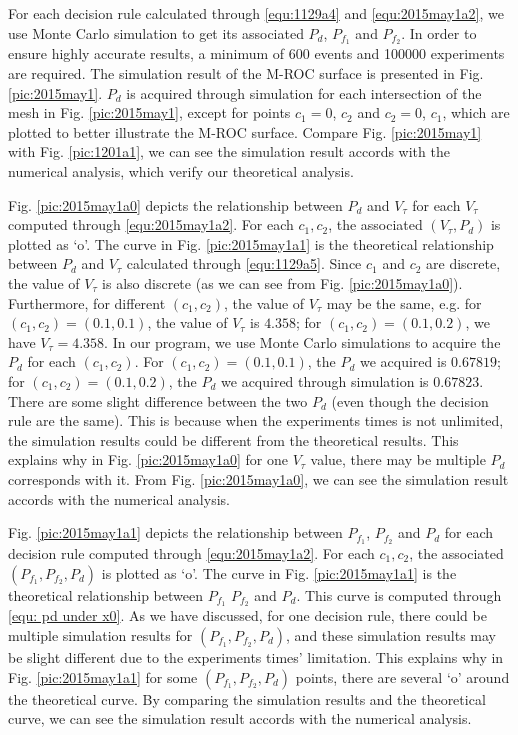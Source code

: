 For each decision rule calculated through \eqref{equ:1129a4} and \eqref{equ:2015may1a2}, we use Monte Carlo simulation to get its associated $P_d$, $P_{f_1}$ and $P_{f_2}$.   
In order to ensure highly accurate results, a minimum of 600 events and 100000 experiments are required. The simulation result of the M-ROC surface is presented in Fig. \ref{pic:2015may1}. $P_d$ is acquired through simulation for each intersection of the mesh in Fig. \ref{pic:2015may1}, except for points $c_1 = 0$, $c_2$ and $c_2 = 0$, $c_1$, which are plotted to better illustrate the M-ROC surface. 
Compare Fig. \ref{pic:2015may1} with Fig. \ref{pic:1201a1}, we can see the simulation result accords with the numerical analysis, which verify our theoretical analysis.

Fig. \ref{pic:2015may1a0} depicts the relationship between  $P_d$ and $V_\tau$ for each $V_\tau$  computed through \eqref{equ:2015may1a2}.  For each $c_1, c_2$, the associated $(V_\tau, P_d)$ is plotted as `o'. The curve in Fig. \ref{pic:2015may1a1} is the theoretical relationship between $P_d$ and $V_\tau$ calculated through \eqref{equ:1129a5}. 
Since $c_1$ and $c_2$ are discrete, the value of $V_\tau$ is also discrete (as we can see from Fig. \ref{pic:2015may1a0}). Furthermore, for different $(c_1, c_2)$, the value of $V_\tau$ may be the same, 
e.g. for $(c_1, c_2) = (0.1, 0.1)$, the value of $V_\tau$ is $4.358$; for $(c_1, c_2) = (0.1, 0.2)$, we have $V_\tau = 4.358$.  
In our program, we use Monte Carlo simulations to acquire the $P_d$ for each $(c_1, c_2)$.  For  $(c_1, c_2) = (0.1, 0.1)$, the $P_d$ we acquired is $0.67819$; for $(c_1, c_2) = (0.1, 0.2)$, the $P_d$ we acquired through simulation is $0.67823$. There are some slight difference between the two $P_d$ (even though the decision rule are the same). This is because when the   experiments times is not unlimited, the simulation results could be different from the theoretical results. This explains why in Fig. \ref{pic:2015may1a0} for one $V_\tau$ value, there may be multiple $P_d$ corresponds with it.  
From Fig. \ref{pic:2015may1a0}, we can see the simulation result accords with the numerical analysis. 

Fig. \ref{pic:2015may1a1} depicts the relationship between $P_{f_1}$, $P_{f_2}$ and $P_d$ for each decision rule computed through \eqref{equ:2015may1a2}.  
For each $c_1, c_2$, the associated $(P_{f_1}, P_{f_2}, P_d) $ is plotted as `o'.
The curve in Fig. \ref{pic:2015may1a1} is the theoretical relationship between $P_{f_1}$ $P_{f_2}$ and $P_d$. This curve is computed through \eqref{equ: pd under x0}. 
As we have discussed, for one decision rule, there could be multiple simulation results for $(P_{f_1}, P_{f_2}, P_d)$, and these simulation results may be slight different due to the experiments times' limitation. 
This explains why in Fig. \ref{pic:2015may1a1} for some $(P_{f_1}, P_{f_2}, P_d)$ points, there are several  `o' around the theoretical curve.
By comparing the simulation results and the theoretical curve, we can see the simulation result accords with the numerical analysis. 


